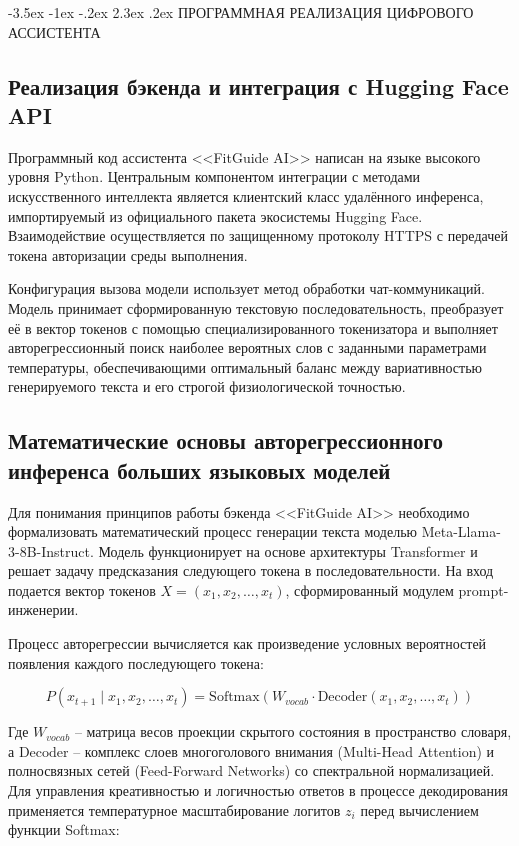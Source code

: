 \documentclass[14pt, a4paper]{extarticle}
\makeatletter
\renewcommand\section{\@startsection {section}{1}{\z@}%
                                   {-3.5ex \@plus -1ex \@minus -.2ex}%
                                   {2.3ex \@plus.2ex}%
                                   {\centering\normalfont\Large\bfseries}}
\makeatother
\begin{document}
\newpage
\section{ПРОГРАММНАЯ РЕАЛИЗАЦИЯ ЦИФРОВОГО АССИСТЕНТА}

\subsection{Реализация бэкенда и интеграция с Hugging Face API}

Программный код ассистента <<FitGuide AI>> написан на языке высокого уровня Python. Центральным компонентом интеграции с методами искусственного интеллекта является клиентский класс удалённого инференса, импортируемый из официального пакета экосистемы Hugging Face. Взаимодействие осуществляется по защищенному протоколу HTTPS с передачей токена авторизации среды выполнения.

Конфигурация вызова модели использует метод обработки чат-коммуникаций. Модель принимает сформированную текстовую последовательность, преобразует её в вектор токенов с помощью специализированного токенизатора и выполняет авторегрессионный поиск наиболее вероятных слов с заданными параметрами температуры, обеспечивающими оптимальный баланс между вариативностью генерируемого текста и его строгой физиологической точностью.

\subsection{Математические основы авторегрессионного инференса больших языковых моделей}

Для понимания принципов работы бэкенда <<FitGuide AI>> необходимо формализовать математический процесс генерации текста моделью Meta-Llama-3-8B-Instruct. Модель функционирует на основе архитектуры Transformer и решает задачу предсказания следующего токена в последовательности. На вход подается вектор токенов $X = (x_1, x_2, \dots, x_t)$, сформированный модулем prompt-инженерии.

Процесс авторегрессии вычисляется как произведение условных вероятностей появления каждого последующего токена:

\begin{equation}\label{llm_prob}
P(x_{t+1} \mid x_1, x_2, \dots, x_t) = \text{Softmax}(W_{vocab} \cdot \text{Decoder}(x_1, x_2, \dots, x_t))
\end{equation}

Где $W_{vocab}$ -- матрица весов проекции скрытого состояния в пространство словаря, а $\text{Decoder}$ -- комплекс слоев многоголового внимания (Multi-Head Attention) и полносвязных сетей (Feed-Forward Networks) со спектральной нормализацией. Для управления креативностью и логичностью ответов в процессе декодирования применяется температурное масштабирование логитов $z_i$ перед вычислением функции Softmax:
\end{document}
